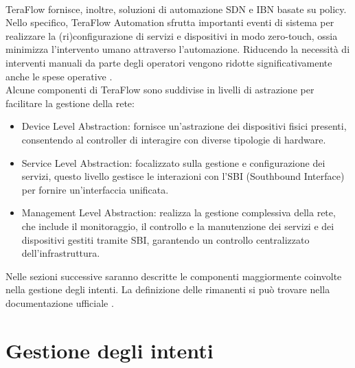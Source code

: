 \\TeraFlow fornisce, inoltre, soluzioni di automazione SDN e IBN basate su policy. Nello specifico, TeraFlow Automation sfrutta 
importanti eventi di sistema per realizzare la (ri)configurazione di servizi e dispositivi in modo zero-touch, ossia minimizza l'intervento umano attraverso l'automazione.
Riducendo la necessità di interventi manuali da parte degli operatori vengono ridotte significativamente anche le spese operative \cite{Component}.
\\Alcune componenti di TeraFlow sono suddivise in livelli di astrazione per facilitare la gestione della rete:
\begin{itemize}
\item Device Level Abstraction: fornisce un'astrazione dei dispositivi fisici presenti, consentendo al controller di interagire con diverse tipologie di hardware.
\item Service Level Abstraction: focalizzato sulla gestione e configurazione dei servizi, questo livello gestisce le interazioni con l'SBI (Southbound Interface) per fornire un'interfaccia unificata.
\item Management Level Abstraction: realizza la gestione complessiva della rete, che include il monitoraggio, il controllo e la manutenzione dei servizi e dei dispositivi gestiti tramite SBI, garantendo un controllo centralizzato dell'infrastruttura.
\end{itemize}
Nelle sezioni successive saranno descritte le componenti maggiormente coinvolte nella gestione degli intenti.
La definizione delle rimanenti si può trovare nella documentazione ufficiale \cite{D32}. 

\section{Gestione degli intenti}
